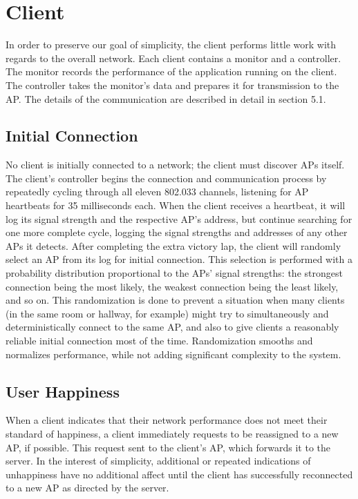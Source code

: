\documentclass[10pt,journal,compsoc]{IEEEtran}
\begin{document}
		\section{Client}
		In order to preserve our goal of simplicity, the client performs little work with regards to the overall network. Each client contains a monitor and a controller. The monitor records the performance of the application running on the client. The controller takes the monitor's data and prepares it for transmission to the AP. The details of the communication are described in detail in section 5.1.
		
		\subsection{Initial Connection}
		No client is initially connected to a network; the client must discover APs itself. The client's controller begins the connection and communication process by repeatedly cycling through all eleven 802.033 channels, listening for AP heartbeats for 35 milliseconds each. When the client receives a heartbeat, it will log its signal strength and the respective AP’s address, but continue searching for one more complete cycle, logging the signal strengths and addresses of any other APs it detects. After completing the extra victory lap, the client will randomly select an AP from its log for initial connection. This selection is performed with a probability distribution proportional to the APs' signal strengths: the strongest connection being the most likely, the weakest connection being the least likely, and so on. This randomization is done to prevent a situation when many clients (in the same room or hallway, for example) might try to simultaneously and deterministically connect to the same AP, and also to give clients a reasonably reliable initial connection most of the time. Randomization smooths and normalizes performance, while not adding significant complexity to the system.
		
		\subsection{User Happiness}
		When a client indicates that their network performance does not meet their standard of happiness, a client immediately requests to be reassigned to a new AP, if possible. This request sent to the client's AP, which forwards it to the server. In the interest of simplicity, additional or repeated indications of unhappiness have no additional affect until the client has successfully reconnected to a new AP as directed by the server.
		
\end{document}
